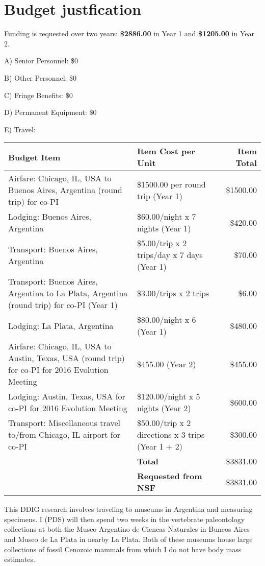 \documentclass[11pt,letterpaper]{article}
\begin{document}
\setcounter{secnumdepth}{0}
\section{Budget justfication}

Funding is requested over two years: \textbf{\$2886.00} in Year 1 and \textbf{\$1205.00} in Year 2.

A) Senior Personnel: \$0

B) Other Personnel: \$0

C) Fringe Benefits: \$0

D) Permanent Equipment: \$0

E) Travel:

\begin{tabular}[H]{p{7.5cm} p{4.5cm} r}
  Budget Item & Item Cost per Unit & Item Total \\
  \hline
  Airfare: Chicago, IL, USA to Buenos Aires, Argentina (round trip) for co-PI & \$1500.00 per round trip (Year 1) & \$1500.00 \\
  Lodging: Buenos Aires, Argentina & \$60.00/night x 7 nights (Year 1) & \$420.00 \\
  Transport: Buenos Aires, Argentina & \$5.00/trip x 2 trips/day x 7 days (Year 1) & \$70.00 \\
  Transport: Buenos Aires, Argentina to La Plata, Argentina (round trip) for co-PI (Year 1) & \$3.00/trips x 2 trips & \$6.00 \\
  Lodging: La Plata, Argentina & \$80.00/night x 6 (Year 1) & \$480.00 \\
  Airfare: Chicago, IL, USA to Austin, Texas, USA (round trip) for co-PI for 2016 Evolution Meeting & \$455.00 (Year 2) & \$455.00 \\
  Lodging: Austin, Texas, USA for co-PI for 2016 Evolution Meeting & \$120.00/night x 5 nights (Year 2) & \$600.00 \\
  Transport: Miscellaneous travel to/from Chicago, IL airport for co-PI & \$50.00/trip x 2 directions x 3 trips (Year 1 + 2) & \$300.00 \\
  & \textbf{Total} & \$3831.00 \\
  & \textbf{Requested from NSF} & \$3831.00
\end{tabular}

This DDIG research involves traveling to museums in Argentina and measuring specimens. I (PDS) will then spend two weeks in the vertebrate paleontology collections at both the Museo Argentino de Ciencas Naturales in Buneos Aires and Museo de La Plata in nearby La Plata. Both of these museums house large collections of fossil Cenozoic mammals from which I do not have body mass estimates.
\end{document}
